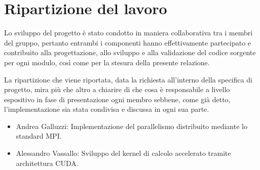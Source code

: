 
\chapter{Ripartizione del lavoro}

Lo sviluppo del progetto è stato condotto in maniera collaborativa
tra i membri del gruppo, pertanto entrambi i componenti 
hanno effettivamente partecipato e contribuito
alla progettazione, allo sviluppo e alla validazione del codice sorgente per ogni modulo,
così come per la stesura della presente relazione.

La ripartizione
che viene riportata, data la richiesta all'interno della specifica di progetto,
mira più che altro a chiarire di che cosa è responsabile a livello
espositivo in fase di presentazione ogni membro sebbene, come già detto,
l'implementazione sia stata condivisa e discussa in ogni sua parte.


\begin{itemize}
    \item Andrea Galluzzi: Implementazione del parallelismo distribuito mediante lo standard MPI.
    \item Alessandro Vassallo: Sviluppo del kernel di calcolo accelerato tramite architettura CUDA.
\end{itemize}